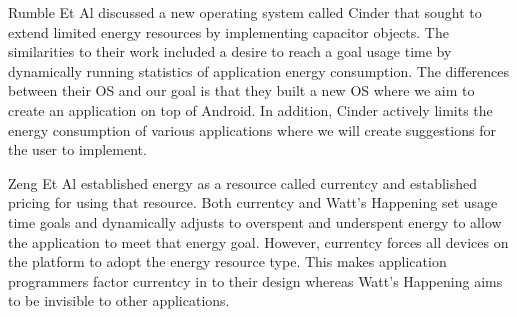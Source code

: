 Rumble Et Al discussed a new operating system called Cinder that sought to extend limited energy resources by implementing capacitor objects.  The similarities to
their work included a desire to reach a goal usage time by dynamically running statistics of application energy consumption.  The differences between their OS and our
goal is that they built a new OS where we aim to create an application on top of Android.  In addition, Cinder actively limits the energy consumption of various
applications where we will create suggestions for the user to implement.

Zeng Et Al established energy as a resource called currentcy and established pricing for using that resource.  Both currentcy and Watt's Happening set usage
time goals and dynamically adjusts to overspent and underspent energy to allow the application to meet that energy goal.  However, currentcy forces all
devices on the platform to adopt the energy resource type.  This makes application programmers factor currentcy in to their design whereas Watt's Happening
aims to be invisible to other applications.
